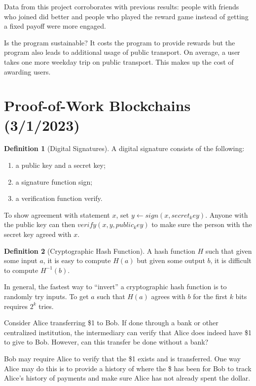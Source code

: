 \documentclass[dvipsnames]{article}
\theoremstyle{definition}
\newtheorem{definition}{Definition}[section]
\theoremstyle{remark}
\begin{document}
Data from this project corroborates with previous results: people with friends who joined did better and people who played the reward game instead of getting a fixed payoff were more engaged.

Is the program sustainable? It costs the program to provide rewards but the program also leads to additional usage of public transport. On average, a user takes one more weekday trip on public transport. This makes up the cost of awarding users.

\newpage

\section{Proof-of-Work Blockchains (3/1/2023)}

\begin{definition}[Digital Signatures]
	A digital signature consists of the following:
	\begin{enumerate}
		\item a public key and a secret key;
		\item a signature function sign;
		\item a verification function verify.
	\end{enumerate}
	To show agreement with statement $x$, set $y \leftarrow sign(x,secret_key)$. Anyone with the public key can then $verify(x,y,public_key)$ to make sure the person with the secret key agreed with $x$.
\end{definition}

\begin{definition}[Cryptographic Hash Function]
	A hash function $H$ such that given some input $a$, it is easy to compute $H(a)$ but given some output $b$, it is difficult to compute $H^{-1}(b)$.
\end{definition}
In general, the fastest way to ``invert'' a cryptographic hash function is to randomly try inputs. To get $a$ such that $H(a)$ agrees with $b$ for the first $k$ bits requires $2^k$ tries. 

Consider Alice transferring \$1 to Bob. If done through a bank or other centralized institution, the intermediary can verify that Alice does indeed have \$1 to give to Bob. However, can this transfer be done without a bank?

Bob may require Alice to verify that the \$1 exists and is transferred. One way Alice may do this is to provide a history of where the \$ has been for Bob to track Alice's history of payments and make sure Alice has not already spent the dollar. 
\end{document}

